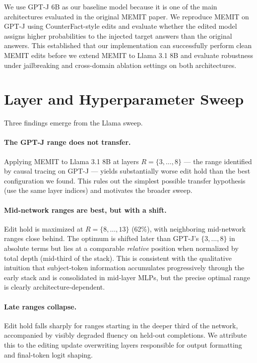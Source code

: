 \documentclass[11pt]{article}
\begin{document}
We use GPT-J 6B as our baseline model because it is one of the main architectures evaluated in the original MEMIT paper. We reproduce MEMIT on GPT-J using CounterFact-style edits and evaluate whether the edited model assigns higher probabilities to the injected target answers than the original answers. This established that our implementation can successfully perform clean MEMIT edits before we extend MEMIT to Llama 3.1 8B and evaluate robustness under jailbreaking and cross-domain ablation settings on both architectures.

\section{Layer and Hyperparameter Sweep}
\label{sec:sweep}

Three findings emerge from the Llama sweep.

\paragraph{The GPT-J range does not transfer.}
Applying MEMIT to Llama 3.1 8B at layers $R = \{3, \dots, 8\}$ --- the range identified by causal tracing on GPT-J --- yields substantially worse edit hold than the best configuration we found. This rules out the simplest possible transfer hypothesis (use the same layer indices) and motivates the broader sweep.

\paragraph{Mid-network ranges are best, but with a shift.}
Edit hold is maximized at $R = \{8, \dots, 13\}$ (62\%), with neighboring mid-network ranges close behind. The optimum is shifted later than GPT-J's $\{3, \dots, 8\}$ in absolute terms but lies at a comparable \emph{relative} position when normalized by total depth (mid-third of the stack). This is consistent with the qualitative intuition that subject-token information accumulates progressively through the early stack and is consolidated in mid-layer MLPs, but the precise optimal range is clearly architecture-dependent.

\paragraph{Late ranges collapse.}
Edit hold falls sharply for ranges starting in the deeper third of the network, accompanied by visibly degraded fluency on held-out completions. We attribute this to the editing update overwriting layers responsible for output formatting and final-token logit shaping.
\end{document}
